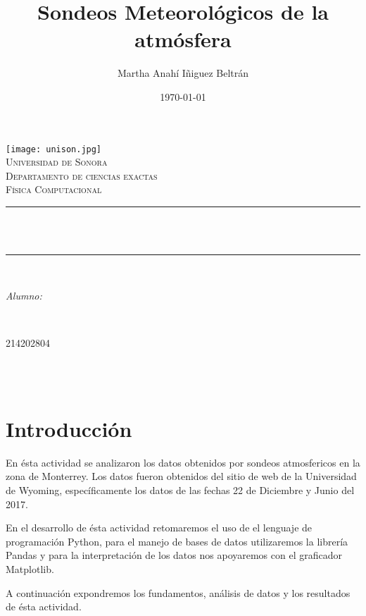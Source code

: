 \documentclass[12pt]{article}
\title{Sondeos Meteorológicos de la atmósfera}								%
\author{Martha Anahí Iñiguez Beltrán}						%
\date{\today}											%
\makeatletter
\let\thetitle\@title
\let\theauthor\@author
\let\thedate\@date
\makeatother
\begin{document}
\begin{titlepage}
\centering
    \vspace*{0.5 cm}
    \texttt{[image: unison.jpg]}\\[1.0 cm]	%
    \textsc{\LARGE Universidad de Sonora}\\[2.0 cm]	%
    \textsc{\Large Departamento de ciencias exactas}\\[1.0 cm]
\textsc{\Large Física Computacional}\\[0.5 cm]
\rule{\linewidth}{0.2 mm} \\[0.4 cm]
{ \huge \bfseries \thetitle}\\
\rule{\linewidth}{0.2 mm} \\[1.5 cm]
\begin{minipage}{0.6\textwidth}
\begin{flushleft} \large
\emph{Alumno:}\\
\theauthor
\end{flushleft}
\end{minipage}~
\begin{minipage}{0.4\textwidth}
\begin{flushright} \large
214202804
\end{flushright}
\end{minipage}\\[2 cm]


{\large \thedate}\\[2 cm]

\vfill

\end{titlepage}

\tableofcontents
\pagebreak

\section{Introducción}

En ésta actividad se analizaron los datos obtenidos por sondeos atmosfericos en la zona de Monterrey. Los datos fueron obtenidos del sitio de web de la Universidad de Wyoming, específicamente los datos de las fechas 22 de Diciembre y Junio del 2017.

En el desarrollo de ésta actividad retomaremos el uso de el lenguaje de programación Python, para el manejo de bases de datos utilizaremos la librería Pandas y para la interpretación de los datos nos apoyaremos con el graficador Matplotlib.

A continuación expondremos los fundamentos, análisis de datos y los resultados de ésta actividad.
\end{document}
